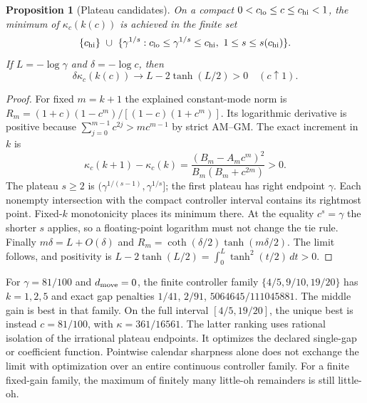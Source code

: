 \documentclass[11pt]{article}
\newtheorem{proposition}{Proposition}
\begin{document}
\begin{proposition}[Plateau candidates]\label{prop:settling}
On a compact $0<c_{\rm lo}\le c\le c_{\rm hi}<1$, the minimum of
$\kappa_c(k(c))$ is achieved in the finite set
\[
\{c_{\rm hi}\}\ \cup\
\{\gamma^{1/s}:c_{\rm lo}\le\gamma^{1/s}\le c_{\rm hi},
\ 1\le s\le s(c_{\rm hi})\}.
\]
If $L=-\log\gamma$ and $\delta=-\log c$, then
\[
\delta\kappa_c(k(c))\longrightarrow L-2\tanh(L/2)>0
\quad(c\uparrow1).
\]
\end{proposition}
\begin{proof}
For fixed $m=k+1$ the explained constant-mode norm is
$R_m=(1+c)(1-c^m)/[(1-c)(1+c^m)]$.
Its logarithmic derivative is positive because
$\sum_{j=0}^{m-1}c^{2j}>mc^{m-1}$ by strict AM--GM.
The exact increment in $k$ is
\[
\kappa_c(k+1)-\kappa_c(k)
=\frac{(B_m-A_mc^m)^2}{B_m(B_m+c^{2m})}>0.
\]
The plateau $s\ge2$ is $(\gamma^{1/(s-1)},\gamma^{1/s}]$;
the first plateau has right endpoint $\gamma$.
Each nonempty intersection with the compact controller interval contains its
rightmost point. Fixed-$k$ monotonicity places its minimum there.
At the equality $c^s=\gamma$ the shorter $s$ applies, so a floating-point
logarithm must not change the tie rule.
Finally $m\delta=L+O(\delta)$ and
$R_m=\coth(\delta/2)\tanh(m\delta/2)$.
The limit follows, and positivity is
$L-2\tanh(L/2)=\int_0^L\tanh^2(t/2)\,dt>0$.
\end{proof}
For $\gamma=81/100$ and $d_{\rm move}=0$, the finite controller family
$\{4/5,9/10,19/20\}$ has $k=1,2,5$ and exact gap penalties
$1/41$, $2/91$, $5064645/111045881$.
The middle gain is best in that family. On the full interval $[4/5,19/20]$,
the unique best is instead $c=81/100$, with $\kappa=361/16561$.
The latter ranking uses rational isolation of the irrational plateau endpoints.
It optimizes the declared single-gap or coefficient function. Pointwise
calendar sharpness alone does not exchange the limit with optimization over
an entire continuous controller family. For a finite fixed-gain family,
the maximum of finitely many little-oh remainders is still little-oh.
\end{document}
